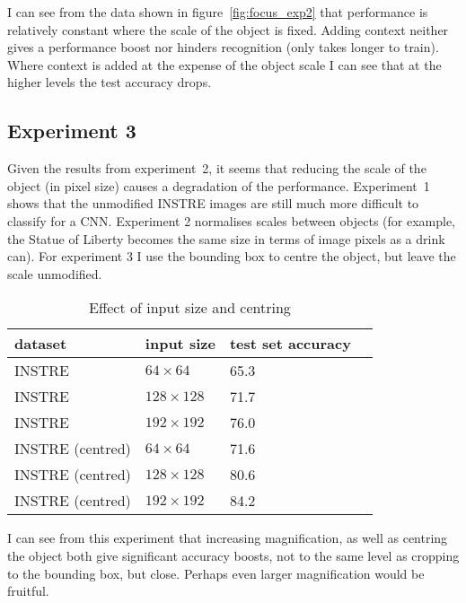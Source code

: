 I can see from the data shown in figure~\ref{fig:focus_exp2} that performance is relatively constant where the scale of the object is fixed. Adding context neither gives a performance boost nor hinders recognition (only takes longer to train). Where context is added at the expense of the object scale I can see that at the higher levels the test accuracy drops.


\subsection {Experiment 3}

Given the results from experiment~2, it seems that reducing the scale of the object (in pixel size) causes a degradation of the performance. Experiment~1 shows that the unmodified INSTRE images are still much more difficult to classify for a CNN. Experiment 2 normalises scales between objects (for example, the Statue of Liberty becomes the same size in terms of image pixels as a drink can). For experiment 3 I use the bounding box to centre the object, but leave the scale unmodified.


\begin{table}[h]
  \centering
    \caption{Effect of input size and centring}
    
  \begin{tabular}{ l l l l }
    
    dataset & input size & test set accuracy \\
    \toprule
    
    INSTRE &  $ 64 \times 64 $ & 65.3 \\
    INSTRE &  $ 128 \times 128 $  & 71.7 \\
    INSTRE &  $ 192 \times 192 $  & 76.0 \\
    
    \toprule
    INSTRE (centred) &  $ 64 \times 64 $ & 71.6 \\
    INSTRE (centred) &  $ 128 \times 128 $  & 80.6 \\
    INSTRE (centred) &  $ 192 \times 192 $  & 84.2 \\
    
    
    
    \bottomrule
  \end{tabular}
\label{fig:focus_input_size}
\end{table}



I can see from this experiment that increasing magnification, as well as centring the object both give significant accuracy boosts, not to the same level as cropping to the bounding box, but close. Perhaps even larger magnification would be fruitful. 

